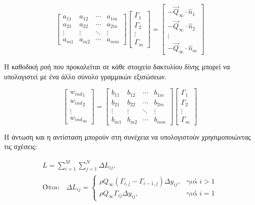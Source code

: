 \begin{equation}
\begin{bmatrix}
a_{11} & a_{12} & \cdots & a_{1m} \\
a_{21} & a_{22} & \cdots & a_{2m} \\
 \vdots & \vdots & \ddots & \vdots \\
a_{m1} & a_{m2} & \cdots & a_{mm}
\end{bmatrix}\begin{bmatrix}
\Gamma_{1} \\
\Gamma_{2} \\
 \vdots \\
\Gamma_{m}
\end{bmatrix} = \begin{bmatrix}
 - {\vec{Q}}_{\infty} \cdot {\hat{n}}_{1} \\
 - {\vec{Q}}_{\infty} \cdot {\hat{n}}_{2} \\
 \vdots \\
 - {\vec{Q}}_{\infty} \cdot {\hat{n}}_{m}
\end{bmatrix}
\end{equation}


Η καθοδική ροή που προκαλείται σε κάθε στοιχείο δακτυλίου δίνης μπορεί να υπολογιστεί με ένα άλλο σύνολο γραμμικών εξισώσεων.

\begin{equation}
\begin{bmatrix}
{w_{ind}}_{1} \\
{w_{ind}}_{2} \\
 \vdots \\
{w_{ind}}_{m}
\end{bmatrix} = \begin{bmatrix}
b_{11} & b_{12} & \cdots & b_{1m} \\
b_{21} & b_{22} & \cdots & b_{2m} \\
 \vdots & \vdots & \ddots & \vdots \\
b_{m1} & b_{m2} & \cdots & b_{mm}
\end{bmatrix}\begin{bmatrix}
\Gamma_{1} \\
\Gamma_{2} \\
 \vdots \\
\Gamma_{m}
\end{bmatrix}
\end{equation}


Η άντωση και η αντίσταση μπορούν στη συνέχεια να υπολογιστούν χρησιμοποιώντας τις σχέσεις:

\begin{multline}
    L = \sum_{i = 1}^{M} \sum_{j = 1}^{N} \Delta L_{ij}, \\
    \text{Όπου} \quad \Delta L_{ij} = \begin{cases}
      \rho Q_{\infty} \left( \Gamma_{i,j} - \Gamma_{i - 1,j} \right) \Delta y_{ij}, & \text{γιά } i > 1 \\
      \rho Q_{\infty} \Gamma_{ij} \Delta y_{ij}, & \text{γιά } i = 1
    \end{cases}
  \end{multline}

